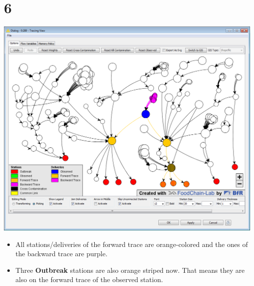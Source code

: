 \documentclass{beamer}
\begin{document}
\section{6}
\begin{frame}
	\begin{center}
  		\includegraphics[height=0.6\textheight]{6.png}
	\end{center}
	\begin{itemize}
		\item All stations/deliveries of the forward trace are orange-colored and the ones of the backward trace are purple.
		\item Three \textbf{Outbreak} stations are also orange striped now. That means they are also on the forward trace of the observed station.
	\end{itemize}
\end{frame}
\end{document}
